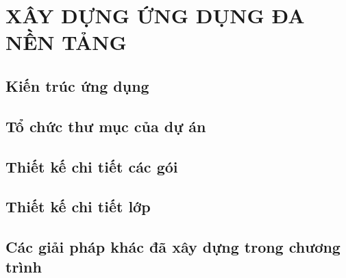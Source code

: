 \chapter{XÂY DỰNG ỨNG DỤNG ĐA NỀN TẢNG}\label{chap:xay-dung}

\section{Kiến trúc ứng dụng}
\pending

\section{Tổ chức thư mục của dự án}
\pending

\section{Thiết kế chi tiết các gói}
\pending

\section{Thiết kế chi tiết lớp}
\pending

\section{Các giải pháp khác đã xây dựng trong chương trình}
\pending
